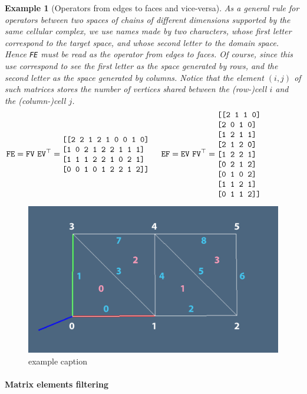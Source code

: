 \documentclass[11pt,oneside]{article}	%
\newtheorem{example}{Example}
\begin{document}
\begin{example}[Operators from edges to faces and vice-versa]\label{ex:denseMat}
As a general rule for operators between two spaces of chains of different dimensions supported by the \emph{same} cellular complex, we use names made by two characters, whose first letter correspond to the target space, and whose second letter to the domain space. Hence \texttt{FE} must be read as the operator from edges to faces. Of course, since this use correspond to see the first letter as the space generated by rows, and the second letter as the space generated by columns. Notice that the element $(i,j)$ of such matrices stores the number of vertices shared between the (row-)cell $i$ and the (column-)cell $j$.
\[
\texttt{FE} = \texttt{FV}\ \texttt{EV}^\top = 
\begin{minipage}[c]{0.29\linewidth}
\begin{verbatim}
[[2 2 1 2 1 0 0 1 0]
 [1 0 2 1 2 2 1 1 1]
 [1 1 1 2 2 1 0 2 1]
 [0 0 1 0 1 2 2 1 2]]
\end{verbatim}
\end{minipage}
\qquad
\texttt{EF} = \texttt{EV}\ \texttt{FV}^\top = 
\begin{minipage}[c]{0.29\linewidth}
\begin{verbatim}
[[2 1 1 0]
 [2 0 1 0]
 [1 2 1 1]
 [2 1 2 0]
 [1 2 2 1]
 [0 2 1 2]
 [0 1 0 2]
 [1 1 2 1]
 [0 1 1 2]]
\end{verbatim}
\end{minipage}
\]
\end{example}

\begin{figure}[htbp] %
   \centering
   \includegraphics[width=0.6\linewidth]{images/2complex} 
   \caption{example caption}
   \label{fig:2complex}
\end{figure}

\paragraph{Matrix elements filtering}
\end{document}
